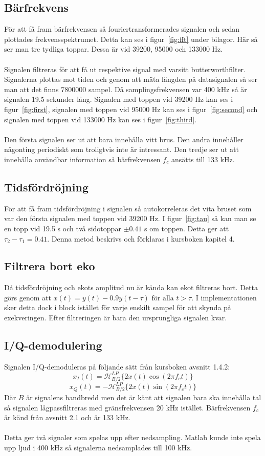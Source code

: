 \documentclass[10pt,twocolumn]{article}
\begin{document}
\subsection{Bärfrekvens}
För att få fram bärfrekvensen så fouriertransformerades signalen och sedan plottades frekvensspektrumet. Detta kan ses i figur~\ref{fig:fft} under bilagor.
Här så ser man tre tydliga toppar. Dessa är vid 39200, 95000 och 133000 Hz.
\\
\\
Signalen filtreras för att få ut respektive signal med varsitt butterworthfilter. Signalerna plottas mot tiden och genom att mäta längden på datasignalen så ser man att det finns 7800000 sampel. Då samplingsfrekvensen var 400 kHz så är signalen 19.5 sekunder lång. Signalen med toppen vid 39200 Hz kan ses i 
figur~\ref{fig:first}, signalen med toppen vid 95000 Hz kan ses i figur~\ref{fig:second} och signalen med toppen vid 133000 Hz kan ses i figur~\ref{fig:third}.
\\
\\
Den första signalen ser ut att bara innehålla vitt brus. Den andra innehåller någonting periodiskt som troligtvis inte är intressant. Den tredje ser ut att innehålla användbar information så bärfrekvensen $f_c$ ansätts till 133 kHz.

\subsection{Tidsfördröjning}
För att få fram tidsfördröjning i signalen så autokorreleras det vita bruset som var den första signalen med toppen vid 39200 Hz. I figur~\ref{fig:tau} så kan man se en topp vid 19.5 s och två sidotoppar $\pm 0.41 $ s om toppen. Detta ger att $\tau_{2}-\tau_{1}=0.41$. Denna metod beskrivs och förklaras i kursboken kapitel 4.

\subsection{Filtrera bort eko}
Då tidsfördröjning och ekots amplitud nu är kända kan ekot filtreras bort. Detta görs genom att $x(t)=y(t)-0.9y(t-\tau) \text{ för alla } t>\tau$. I implementationen sker detta dock i block istället för varje enskilt sampel för att skynda på exekveringen. Efter filtreringen är bara den ursprungliga signalen kvar.

\subsection{I/Q-demodulering}
Signalen I/Q-demoduleras på följande sätt från kursboken avsnitt 1.4.2:
$$ x_I(t)= \mathcal{H}^{LP}_{B/2}\{ 2x(t)\cos(2 \pi f_c t) \}$$
$$ x_Q(t)= -\mathcal{H}^{LP}_{B/2}\{ 2x(t)\sin(2 \pi f_c t) \}$$
Där $B$ är signalens bandbredd men det är känt att signalen bara ska innehålla tal så signalen lågpassfiltreras med gränsfrekvensen 20 kHz istället. Bärfrekvensen $f_c$ är känd från avsnitt 2.1 och är 133 kHz.
\\
\\
Detta ger två signaler som spelas upp efter nedsampling. Matlab kunde inte spela upp ljud i 400 kHz så signalerna nedsamplades till 100 kHz. 
\end{document}
